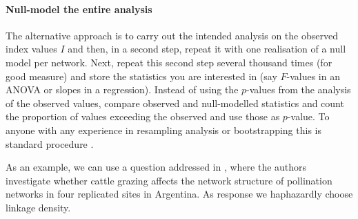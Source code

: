 \documentclass[a4paper, 11pt]{article}\usepackage[]{graphicx}\usepackage[dvipsnames]{xcolor}
\newcommand{\ind}[1]{#1\index{#1}}           			   %
\begin{document}
\paragraph{Null-model the entire analysis}
The alternative approach is to carry out the intended analysis on the observed index values $I$ and then, in a second step, repeat it with one realisation of a null model per network. Next, repeat this second step several thousand times (for good measure) and store the statistics you are interested in (say $F$-values in an ANOVA or slopes in a regression). Instead of using the $p$-values from the analysis of the observed values, compare observed and null-modelled statistics and count the proportion of values exceeding the observed and use those as $p$-value. To anyone with any experience in \ind{resampling analysis} or bootstrapping this is standard procedure \citep{Efron1993,Manly1997}.

As an example, we can use a question addressed in \citet{Vazquez2003}, where the authors investigate whether cattle grazing affects the network structure of pollination networks in four replicated sites in Argentina. As response we haphazardly choose linkage density. %
\end{document}
